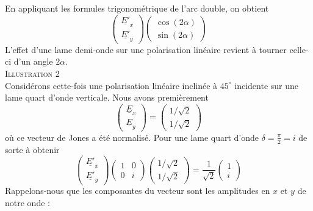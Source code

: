 		En appliquant les formules trigonométrique de l'arc double, on obtient
		\begin{equation}
		\left(\begin{array}{c}
		\underline{E'}_x\\
		\underline{E'}_y
		\end{array}\right)		\left(\begin{array}{cc}
		\cos(2\alpha)\\
		\sin(2\alpha)
		\end{array}\right)
		\end{equation}
		L'effet d'une lame demi-onde sur une polarisation linéaire revient à tourner 
		celle-ci d'un angle $2\alpha$.\\
		
		
		\textsc{Illustration 2}\ \\
		Considérons cette-fois une polarisation linéaire inclinée à $45^\circ$ incidente sur 
		une lame quart d'onde verticale. Nous avons premièrement
		\begin{equation}
		\left(\begin{array}{c}
		\underline{E}_x\\
		\underline{E}_y
		\end{array}\right) = \left(\begin{array}{c}
		1/\sqrt{2}\\
		1/\sqrt{2}
		\end{array}\right)
		\end{equation}
		où ce vecteur de Jones a été normalisé. Pour une lame quart d'onde $\delta = \frac{\pi}{2}
		=i$ de sorte à obtenir
		\begin{equation}
		\left(\begin{array}{c}
		\underline{E'}_x\\
		\underline{E'}_y
		\end{array}\right)		\left(\begin{array}{cc}
		1 & 0\\
		0 & i
		\end{array}\right)\left(\begin{array}{c}
		1/\sqrt{2}\\
		1/\sqrt{2}
		\end{array}\right) = \dfrac{1}{\sqrt{2}}\left(\begin{array}{c}
		1\\
		i
		\end{array}\right)
		\end{equation}
		Rappelons-nous que les composantes du vecteur sont les amplitudes en $x$ et $y$ de notre onde :
